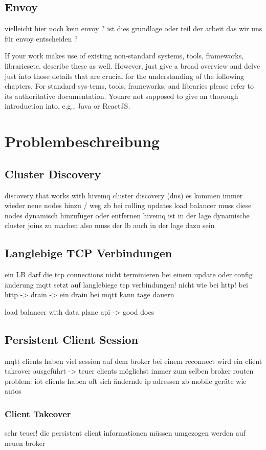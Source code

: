 \subsection{Envoy}
vielleicht hier noch kein envoy ? ist dies grundlage oder teil der arbeit das wir uns für envoy entscheiden ?

If your work makes use of existing non-standard systems, tools, frameworks, librariesetc. describe these as well. However, just give a broad overview and delve just into those details that are crucial for the understanding of the following chapters. For standard sys-tems, tools, frameworks, and libraries please refer to its authoritative documentation. Youare not supposed to give an thorough introduction into, e.g., Java or ReactJS.

\section{Problembeschreibung}

\subsection{Cluster Discovery}
discovery that works with hivemq cluster discovery (dns)
es kommen immer wieder neue nodes hinzu / weg zb bei rolling updates
load balancer muss diese nodes dynamisch hinzufüger oder entfernen
hivemq ist in der lage dynamische cluster joins zu machen also muss der lb auch in der lage dazu sein

\subsection{Langlebige TCP Verbindungen}
ein LB darf die tcp connections nicht terminieren bei einem update oder config änderung
mqtt setzt auf langlebiege tcp verbindungen! nicht wie bei http! bei http -> drain
-> ein drain bei mqtt kann tage dauern

load balancer with data plane api -> good docs
\subsection{Persistent Client Session}
mqtt clients haben viel session auf dem broker
bei einem reconnect wird ein client takeover ausgeführt -> teuer
clients möglichst immer zum selben broker routen
problem: iot clients haben oft sich ändernde ip adressen zb mobile geräte wie autos
\subsubsection{Client Takeover}
sehr teuer! die persistent client informationen müssen umgezogen werden auf neuen broker

